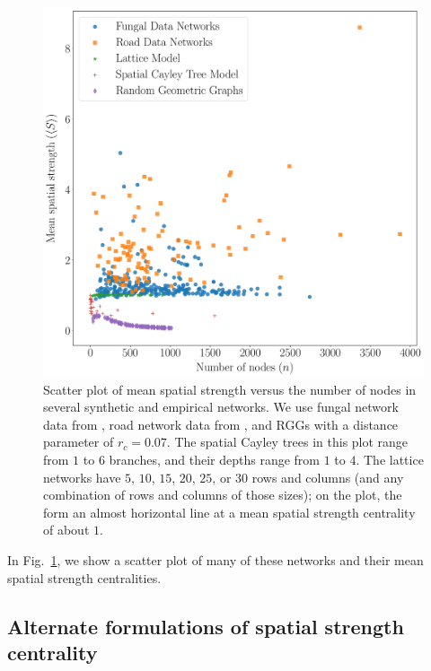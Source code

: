 \documentclass[%
 reprint,
 amsmath,amssymb,
 aps,
]{revtex4-1}
\begin{document}
\begin{figure}
    \centering
    \includegraphics[width=1.0\linewidth]{spatial_scatter_1.pdf}
    \caption{Scatter plot of mean spatial strength versus the number of nodes in several synthetic and empirical networks. We use fungal network data from \cite{fungal_data}, road network data from \cite{road_data}, and RGGs with a distance parameter of $r_c = 0.07$. The spatial Cayley trees in this plot range from $1$ to $6$ branches, and their depths range from $1$ to $4$. The lattice networks have $5$, $10$, $15$, $20$, $25$, or $30$ rows and columns (and any combination of rows and columns of those sizes); on the plot, the form an almost horizontal line at a mean spatial strength centrality of about $1$.
    }
    \label{fig:spatial_distributions}
\end{figure}


In Fig.~\ref{fig:spatial_distributions}, we show a scatter plot of many of these networks and their mean spatial strength centralities.


\subsection{Alternate formulations of spatial strength centrality}\label{sec:alternate_formations}
\end{document}
